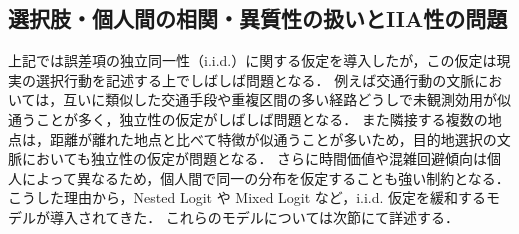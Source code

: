 \subsection{選択肢・個人間の相関・異質性の扱いとIIA性の問題}\label{ssec:iia_intro}
上記では誤差項の独立同一性（i.i.d.）に関する仮定を導入したが，この仮定は現実の選択行動を記述する上でしばしば問題となる．
例えば交通行動の文脈においては，互いに類似した交通手段や重複区間の多い経路どうしで未観測効用が似通うことが多く，独立性の仮定がしばしば問題となる．
また隣接する複数の地点は，距離が離れた地点と比べて特徴が似通うことが多いため，目的地選択の文脈においても独立性の仮定が問題となる．
さらに時間価値や混雑回避傾向は個人によって異なるため，個人間で同一の分布を仮定することも強い制約となる．
こうした理由から，Nested Logit や Mixed Logit など，i.i.d. 仮定を緩和するモデルが導入されてきた．
これらのモデルについては次節にて詳述する．
